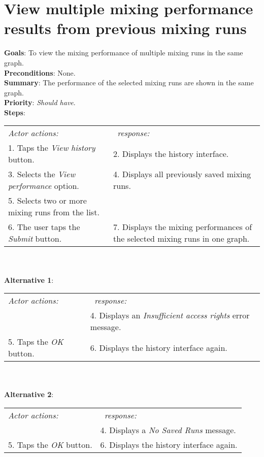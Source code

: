     \section{View multiple mixing performance results from previous mixing runs}
  \label{viewmulruns}
  \textbf{Goals}: To view the mixing performance of multiple mixing runs in the same graph.\\
  \textbf{Preconditions}: None.\\
  \textbf{Summary}: The performance of the selected mixing runs are shown in the same graph.\\
  \textbf{Priority}: \emph{Should have}.\\
  \textbf{Steps}: \\
  \begin{tabular}{ p{} p{} }
  	\emph{Actor actions:} & \emph{\projectname\ response:} \\
	1. Taps the \emph{View history} button. & 2. Displays the history interface. \\
	3. Selects the \emph{View performance} option. & 4. Displays all previously saved mixing runs.\\
	 5. Selects two or more mixing runs from the list. & \\
	 6. The user taps the \emph{Submit} button. & 7. Displays the mixing performances of the selected mixing runs in one graph.\\
  \end{tabular}
  \\
     \\\textbf{Alternative 1}: \\
    \begin{tabular}{ p{} p{} }
  	\emph{Actor actions:} & \emph{\projectname\ response:} \\
            & 4. Displays an \emph{Insufficient access rights} error message. \\
    5. Taps the \emph{OK} button. & 6. Displays the history interface again. \\
    \end{tabular}
            \\
     \\\textbf{Alternative 2}: \\
    \begin{tabular}{ p{} p{} }
  	\emph{Actor actions:} & \emph{\projectname\ response:} \\
            & 4. Displays a \emph{No Saved Runs} message. \\
    5. Taps the \emph{OK} button. & 6. Displays the history interface again. \\
    \end{tabular}

